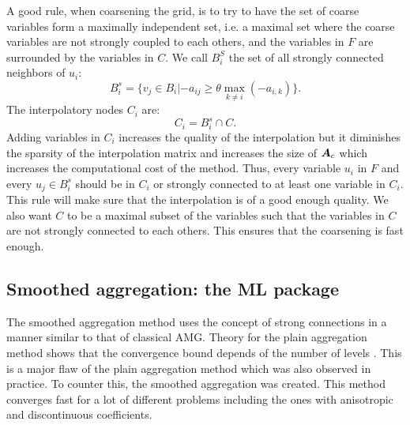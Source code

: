 A good rule, when coarsening the grid, is to try to have the set of coarse 
variables form a maximally independent set, i.e. a maximal set where the 
coarse variables are not strongly coupled to each others, and the variables 
in $F$ are surrounded by the variables in $C$. We call $B_i^S$ the set of all 
strongly connected neighbors of $u_i$:
\begin{equation}
  B_i^s = \{ v_j \in B_i | -a_{ij} \geq \theta \max_{k\neq i}(-a_{i,k})\}.
\end{equation}
The interpolatory nodes $C_i$ are:
\begin{equation}
  C_i = B_i^s \cap C.
\end{equation}
Adding variables in $C_i$ increases the quality of the interpolation but
it diminishes the sparsity of the interpolation matrix and increases the
size of $\boldsymbol{A}_c$ which increases the computational cost of the method.
Thus,  every variable $u_i$ in $F$ and every $u_j \in B_i^s$
should be in $C_i$ or strongly connected to at least one variable in
$C_i$. This rule will make sure that the interpolation is of a good enough
quality. We also want $C$ to be a maximal subset of the variables such that 
the variables in $C$ are not strongly connected to each others. This ensures 
that the coarsening is fast enough.

\subsection{Smoothed aggregation: the ML package}
The smoothed aggregation method uses the concept of strong connections in a
manner similar to that of classical AMG. Theory for the plain
aggregation method shows that the convergence bound depends of the number
of levels \cite{amg_unstruc}. This is a major flaw of the plain aggregation
method which was also observed in practice. To counter this, the smoothed
aggregation was created. This method converges fast for a lot of different 
problems including the ones with anisotropic and discontinuous coefficients.
  
